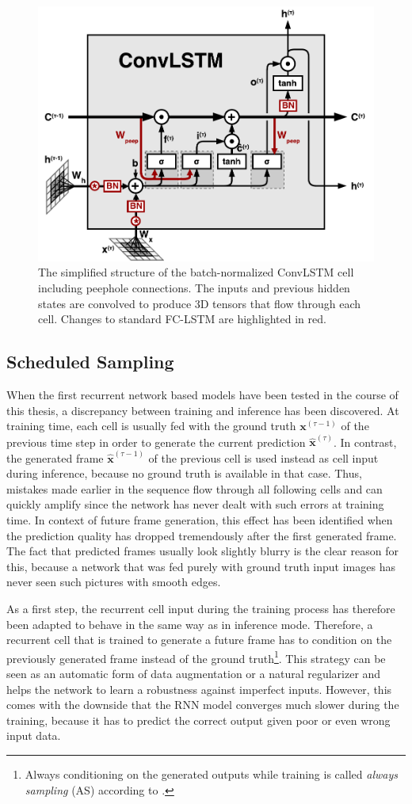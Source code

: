 \begin{figure}[htpb]
	\centering
	\includegraphics[width=0.65\linewidth]{figures/convlstm.pdf} 
	\caption[ConvLSTM Cell]{The simplified structure of the batch-normalized ConvLSTM cell including peephole connections. The inputs and previous hidden states are convolved to produce 3D tensors that flow through each cell. Changes to standard FC-LSTM are highlighted in red.} \label{fig:convlstm-cell}
\end{figure}


\subsection{Scheduled Sampling} \label{sec:sched_sample}

When the first recurrent network based models have been tested in the course of this thesis, a discrepancy between training and inference has been discovered. At training time, each cell is usually fed with the ground truth $\textbf{x}^{(\tau-1)}$ of the previous time step in order to generate the current prediction $\hat{\textbf{x}}^{(\tau)}$. In contrast, the generated frame $ \hat{\textbf{x}}^{(\tau-1)}$ of the previous cell is used instead as cell input during inference, because no ground truth is available in that case. Thus, mistakes made earlier in the sequence flow through all following cells and can quickly amplify since the network has never dealt with such errors at training time. In context of future frame generation, this effect has been identified when the prediction quality has dropped tremendously after the first generated frame. The fact that predicted frames usually look slightly blurry is the clear reason for this, because a network that was fed purely with ground truth input images has never seen such pictures with smooth edges.

As a first step, the recurrent cell input during the training process has therefore been adapted to behave in the same way as in inference mode. Therefore, a recurrent cell that is trained to generate a future frame has to condition on the previously generated frame instead of the ground truth\footnote{Always conditioning on the generated outputs while training is called \textit{always sampling} (AS) according to \parencite{sched_sample}.}. This strategy can be seen as an automatic form of data augmentation or a natural regularizer and helps the network to learn a robustness against imperfect inputs. However, this comes with the downside that the RNN model converges much slower during the training, because it has to predict the correct output given poor or even wrong input data.

